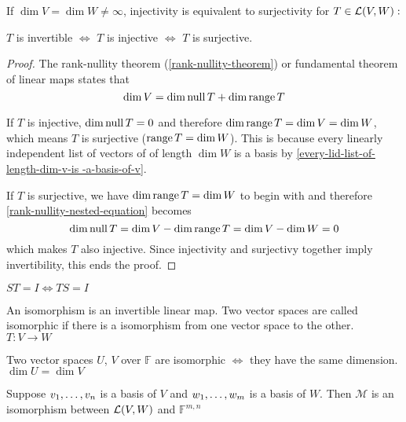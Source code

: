 \setcounter{thm}{64}
\begin{thm}
    \label{injectivity-is-equivalent-to-surjectivity}
    If $\dim V = \dim W \neq \infty$, injectivity is equivalent to surjectivity for $T\in \mathcal{L}(V,W):$
    
    $T$ is invertible $\iff$ $T$ is injective $\iff$ $T$ is surjective.
\end{thm}
\begin{proof}
    The rank-nullity theorem (\ref{rank-nullity-theorem}) or fundamental theorem of linear maps states that 
    \begin{equation}
        \label{rank-nullity-nested-equation}
        \dim V = \dim \operatorname{null} T + \dim \operatorname{range} T
    \end{equation}
    
    If $T$ is injective, $\dim \operatorname{null} T = 0$ and therefore $\dim \operatorname{range} T = \dim V = \dim W$, which means $T$ is surjective ($\operatorname{range} T = \dim W$). This is because every linearly independent list of vectors of of length $\dim W$ is a basis by \ref{every-lid-list-of-length-dim-v-is -a-basis-of-v}.
    
    If $T$ is surjective, we have $\dim \operatorname{range} T = \dim W$ to begin with and therefore \ref{rank-nullity-nested-equation} becomes
    \begin{equation}
        \dim \operatorname{null} T = \dim V - \dim \operatorname{range} T = \dim V - \dim W = 0
    \end{equation}
    which makes $T$ also injective. Since injectivity and surjectivy together imply invertibility, this ends the proof.
\end{proof}


\setcounter{thm}{67}
\begin{thm}
    $ST = I \Leftrightarrow TS=I$
\end{thm}

\begin{thm}
    An isomorphism is an invertible linear map. Two vector spaces are called isomorphic if there is a isomorphism from one vector space to the other. $T:V\to W$ 
\end{thm}

\begin{thm}
    Two \fd vector spaces $U$, $V$ over $\mathbb{F}$ are isomorphic $\iff$ they have the same dimension. $\dim U = \dim V$
\end{thm}

\begin{thm}
    Suppose $v_1, \dots, v_n$ is a basis of $V$ and $w_1, \dots, w_m$ is a basis of $W$. Then $\mathcal{M}$ is an isomorphism between ${\mathcal{L}(V,W)}$ and $\mathbb{F}^{m,n}$ 
\end{thm}

